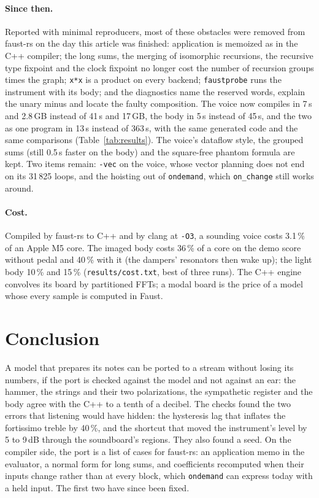 \documentclass[10pt,a4paper,twocolumn]{article}
\newcommand{\faustrs}{faust-rs}
\newcommand{\probe}{\texttt{faustprobe}}
\newcommand{\code}[1]{\texttt{#1}}
\begin{document}
\paragraph{Since then.} Reported with minimal reproducers, most of these obstacles were removed from \faustrs{} on the day this article was finished: application is memoized as in the C++ compiler; the long sums, the merging of isomorphic recursions, the recursive type fixpoint and the clock fixpoint no longer cost the number of recursion groups times the graph; \code{x*x} is a product on every backend; \probe{} runs the instrument with its body; and the diagnostics name the reserved words, explain the unary minus and locate the faulty composition. The voice now compiles in 7\,s and 2.8\,GB instead of 41\,s and 17\,GB, the body in 5\,s instead of 45\,s, and the two as one program in 13\,s instead of 363\,s, with the same generated code and the same comparisons (Table~\ref{tab:results}). The voice's dataflow style, the grouped sums (still 0.5\,s faster on the body) and the square-free phantom formula are kept. Two items remain: \code{-vec} on the voice, whose vector planning does not end on its 31\,825 loops, and the hoisting out of \code{ondemand}, which \code{on\_change} still works around.

\paragraph{Cost.} Compiled by \faustrs{} to C++ and by clang at \code{-O3}, a sounding voice costs 3.1\,\% of an Apple M5 core. The imaged body costs 36\,\% of a core on the demo score without pedal and 40\,\% with it (the dampers' resonators then wake up); the light body 10\,\% and 15\,\% (\code{results/cost.txt}, best of three runs). The C++ engine convolves its board by partitioned FFTs; a modal board is the price of a model whose every sample is computed in Faust.

\section{Conclusion}

A model that prepares its notes can be ported to a stream without losing its numbers, if the port is checked against the model and not against an ear: the hammer, the strings and their two polarizations, the sympathetic register and the body agree with the C++ to a tenth of a decibel. The checks found the two errors that listening would have hidden: the hysteresis lag that inflates the fortissimo treble by 40\,\%, and the shortcut that moved the instrument's level by 5 to 9\,dB through the soundboard's regions. They also found a seed. On the compiler side, the port is a list of cases for \faustrs{}: an application memo in the evaluator, a normal form for long sums, and coefficients recomputed when their inputs change rather than at every block, which \code{ondemand} can express today with a held input. The first two have since been fixed.



\end{document}
